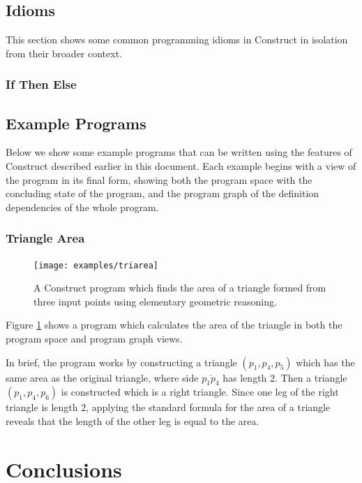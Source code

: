 \documentclass[twoside,openright,11pt]{report}
\begin{document}
\section{Idioms}
\label{sec:idioms}

This section shows some common programming idioms in Construct in isolation from their broader context.

\subsection{If Then Else}
\label{subsec:if}

\section{Example Programs}
\label{sec:example}

Below we show some example programs that can be written using the features of Construct described earlier in this document. 
Each example begins with a view of the program in its final form, showing both the program space with the concluding state of the program, and the program graph of the definition dependencies of the whole program.

\pagebreak

\subsection{Triangle Area}
\label{subsec:triarea}

\begin{figure}[h]
  \centering
  \texttt{[image: examples/triarea]}
  \caption{A Construct program which finds the area of a triangle formed from three input points using elementary geometric reasoning.}
  \label{fig:triarea}
\end{figure}

Figure \ref{fig:triarea} shows a program which calculates the area of the triangle in both the program space and program graph views.

In brief, the program works by constructing a triangle $(p_1,p_4,p_5)$ which has the same area as the original triangle, where side $\overline{p_1p_4}$ has length 2.
Then a triangle $(p_1,p_4,p_6)$ is constructed which is a right triangle. 
Since one leg of the right triangle is length 2, applying the standard formula for the area of a triangle reveals that the length of the other leg is equal to the area.

\chapter{Conclusions}
\label{chap:conclusions}
\end{document}
